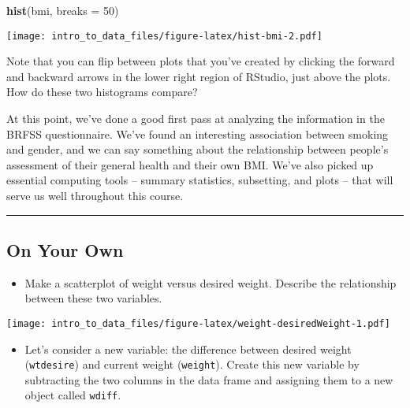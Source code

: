 \documentclass[]{article}
\newenvironment{Shaded}{\begin{snugshade}}{\end{snugshade}}
\newcommand{\KeywordTok}[1]{\textcolor[rgb]{0.13,0.29,0.53}{\textbf{#1}}}
\newcommand{\DataTypeTok}[1]{\textcolor[rgb]{0.13,0.29,0.53}{#1}}
\newcommand{\DecValTok}[1]{\textcolor[rgb]{0.00,0.00,0.81}{#1}}
\newcommand{\StringTok}[1]{\textcolor[rgb]{0.31,0.60,0.02}{#1}}
\newcommand{\OperatorTok}[1]{\textcolor[rgb]{0.81,0.36,0.00}{\textbf{#1}}}
\newcommand{\NormalTok}[1]{#1}
\providecommand{\tightlist}{%
  \setlength{\itemsep}{0pt}\setlength{\parskip}{0pt}}
\begin{document}
\begin{Shaded}
\begin{Highlighting}[]
\KeywordTok{hist}\NormalTok{(bmi, }\DataTypeTok{breaks =} \DecValTok{50}\NormalTok{)}
\end{Highlighting}
\end{Shaded}

\texttt{[image: intro\_to\_data\_files/figure-latex/hist-bmi-2.pdf]}

Note that you can flip between plots that you've created by clicking the
forward and backward arrows in the lower right region of RStudio, just
above the plots. How do these two histograms compare?

At this point, we've done a good first pass at analyzing the information
in the BRFSS questionnaire. We've found an interesting association
between smoking and gender, and we can say something about the
relationship between people's assessment of their general health and
their own BMI. We've also picked up essential computing tools -- summary
statistics, subsetting, and plots -- that will serve us well throughout
this course.

\begin{center}\rule{0.5\linewidth}{\linethickness}\end{center}

\subsection{On Your Own}\label{on-your-own}

\begin{itemize}
\tightlist
\item
  Make a scatterplot of weight versus desired weight. Describe the
  relationship between these two variables.
\end{itemize}

\begin{Shaded}
\end{Shaded}

\texttt{[image: intro\_to\_data\_files/figure-latex/weight-desiredWeight-1.pdf]}

\begin{itemize}
\tightlist
\item
  Let's consider a new variable: the difference between desired weight
  (\texttt{wtdesire}) and current weight (\texttt{weight}). Create this
  new variable by subtracting the two columns in the data frame and
  assigning them to a new object called \texttt{wdiff}.
\end{itemize}
\end{document}
